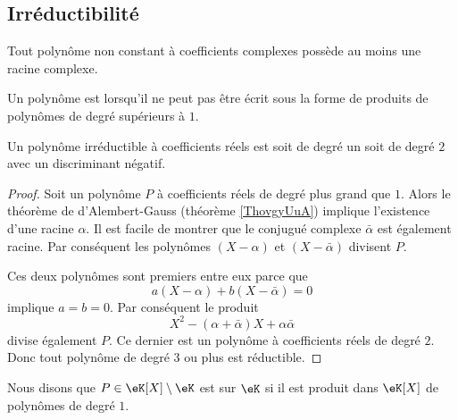 \subsection{Irréductibilité}

\begin{theorem}      \label{ThovgyUuA}
    Tout polynôme non constant à coefficients complexes possède au moins une racine complexe.
\end{theorem}


\begin{definition}      \label{DefIrredfIqydS}
    Un polynôme est  lorsqu'il ne peut pas être écrit sous la forme de produits de polynômes de degré supérieurs à \( 1\).
\end{definition}

\begin{proposition}
    Un polynôme irréductible à coefficients réels est soit de degré un soit de degré \( 2\) avec un discriminant négatif.
\end{proposition}

\begin{proof}
    Soit un polynôme \( P\) à coefficients réels de degré plus grand que \( 1\). Alors le théorème de d'Alembert-Gauss (théorème \ref{ThovgyUuA}) implique l'existence d'une racine \( \alpha\). Il est facile de montrer que le conjugué complexe \( \bar \alpha\) est également racine. Par conséquent les polynômes \( (X-\alpha)\) et \( (X-\bar \alpha)\) divisent \( P\).

    Ces deux polynômes sont premiers entre eux parce que
    \begin{equation}
        a(X-\alpha)+b(X-\bar \alpha)=0
    \end{equation}
    implique \( a=b=0\). Par conséquent le produit 
    \begin{equation}
        X^2-(\alpha+\bar \alpha)X+\alpha\bar\alpha
    \end{equation}
    divise également \( P\). Ce dernier est un polynôme à coefficients réels de degré \( 2\). Donc tout polynôme de degré \( 3\) ou plus est réductible.
\end{proof}

Nous disons que \( P\in\eK[X]\setminus\eK\) est  sur \(\eK\) si il est produit dans \(\eK[X]\) de polynômes de degré \( 1\).

